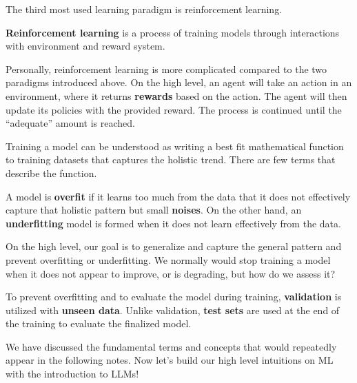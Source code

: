 \documentclass[../../../main.tex]{subfiles}
\begin{document}
The third most used learning paradigm is reinforcement learning.

\begin{definition}{}{}
\textbf{Reinforcement learning} is a process of training models
through interactions with environment and reward system.
\end{definition}

Personally, reinforcement learning is more complicated compared to
the two paradigms introduced above. On the high level, an agent will
take an action in an environment, where it returns \textbf{rewards}
based on the action. The agent will then update its policies with
the provided reward. The process is continued until the ``adequate''
amount is reached.

Training a model can be understood as writing a best fit
mathematical function to training datasets that captures the
holistic trend. There are few terms that describe the function.

\begin{definition}{}{}
A model is \textbf{overfit} if it learns too much from the data
that it does not effectively capture that holistic pattern but
small \textbf{noises}. On the other hand, an \textbf{underfitting}
model is formed when it does not learn effectively from the data.
\end{definition}

On the high level, our goal is to generalize and capture the general
pattern and prevent overfitting or underfitting. We normally would
stop training a model when it does not appear to improve, or is
degrading, but how do we assess it?

\begin{definition}{}{}
To prevent overfitting and to evaluate the model during training,
\textbf{validation} is utilized with \textbf{unseen data}.
Unlike validation, \textbf{test sets} are used at the end of the
training to evaluate the finalized model.
\end{definition}

We have discussed the fundamental terms and concepts that would
repeatedly appear in the following notes. Now let's build our
high level intuitions on ML with the introduction to LLMs!
\end{document}
